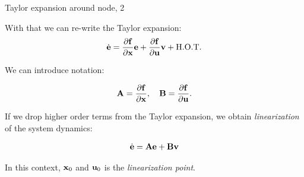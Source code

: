 \documentclass{beamer}
\begin{document}
\begin{frame}{Taylor expansion around node, 2}
	\begin{flushleft}
		
		With that we can re-write the Taylor expansion:
		\begin{align}
			\dot{\mathbf{e}} = \frac{\partial \mathbf{f}}{\partial \mathbf{x}} \mathbf{e} + 
			\frac{\partial \mathbf{f}}{\partial \mathbf{u}} \mathbf{v} + \text{H.O.T.}
		\end{align}		
	
		We can introduce notation:
		
		\begin{align}
			\mathbf{A} = \frac{\partial \mathbf{f}}{\partial \mathbf{x}},  \ \ \
			\mathbf{B} = \frac{\partial \mathbf{f}}{\partial \mathbf{u}}.
		\end{align}
		
		If we drop higher order terms from the Taylor expansion, we obtain \emph{linearization} of the system dynamics:
		
		\begin{align}
			\dot{\mathbf{e}} = \mathbf{A} \mathbf{e} + \mathbf{B} \mathbf{v}
		\end{align}	
	
		In this context, $\mathbf{x}_0$ and $\mathbf{u}_0$ is the \emph{linearization point}.
		
	\end{flushleft}
\end{frame}
\end{document}

